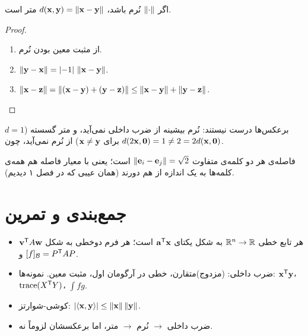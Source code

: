 \begin{theorem}
اگر $\left\lVert \cdot\right\rVert$ نُرم باشد، $d(\mathbf{x},\mathbf{y})=\left\lVert \mathbf{x}-\mathbf{y}\right\rVert$ متر است.
\end{theorem}
\begin{proof}
\begin{enumerate}[label=(\roman*)]
  \item از مثبت معین بودن نُرم.
  \item $\left\lVert \mathbf{y}-\mathbf{x}\right\rVert=\left\lvert -1\right\rvert\,\left\lVert \mathbf{x}-\mathbf{y}\right\rVert$.
  \item $\left\lVert \mathbf{x}-\mathbf{z}\right\rVert=\left\lVert (\mathbf{x}-\mathbf{y})+(\mathbf{y}-\mathbf{z})\right\rVert\le\left\lVert \mathbf{x}-\mathbf{y}\right\rVert+\left\lVert \mathbf{y}-\mathbf{z}\right\rVert$.
\end{enumerate}
\end{proof}

\begin{center}
\end{center}
برعکس‌ها درست نیستند: نُرم بیشینه از ضرب داخلی نمی‌آید، و متر گسسته ($d=1$ برای $\mathbf{x}\neq\mathbf{y}$) از نُرم نمی‌آید، چون $d(2\mathbf{x},\mathbf{0})=1\neq2=2d(\mathbf{x},\mathbf{0})$.

\begin{example}
فاصله‌ی هر دو کلمه‌ی متفاوت $\left\lVert \mathbf{e}_i-\mathbf{e}_j\right\rVert=\sqrt2$ است؛ یعنی با معیار فاصله هم همه‌ی کلمه‌ها به یک اندازه از هم دورند (همان عیبی که در فصل ۱ دیدیم).
\end{example}

\section{جمع‌بندی و تمرین}

\begin{summary}
\begin{itemize}
  \item هر تابع خطی $\mathbb{R}^n\to\mathbb{R}$ به شکل یکتای $\mathbf{a}^{\mathsf{T}}\mathbf{x}$ است؛ هر فرم دوخطی به شکل $\mathbf{v}^{\mathsf{T}} A\mathbf{w}$ و $[f]_{\mathcal B}=P^{\mathsf{T}} AP$.
  \item ضرب داخلی: (مزدوج‌)متقارن، خطی در آرگومان اول، مثبت معین. نمونه‌ها: $\mathbf{x}^{\mathsf{T}}\mathbf{y}$، $\operatorname{trace}(X^{\mathsf{T}} Y)$، $\int fg$.
  \item کوشی-شوارتز: $\left\lvert \left\langle \mathbf{x},\mathbf{y}\right\rangle\right\rvert\le\left\lVert \mathbf{x}\right\rVert\left\lVert \mathbf{y}\right\rVert$.
  \item ضرب داخلی $\to$ نُرم $\to$ متر، اما برعکسشان لزوماً نه.
\end{itemize}
\end{summary}

